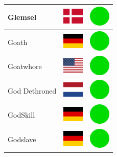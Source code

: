 \documentclass[12pt, a4paper, twoside]{report}
\begin{document}
\begin{center}
\begin{longtable}{|p{5cm}|p{2cm}|p{2cm}|}
 Glemsel                                                    & \includegraphics[width=1cm]{../4x3/dk} &   \includegraphics[width=1cm]{../likes/y} \\ \hline
 Goath                                                      & \includegraphics[width=1cm]{../4x3/de} &   \includegraphics[width=1cm]{../likes/y} \\ \hline
 Goatwhore                                                  & \includegraphics[width=1cm]{../4x3/us} &   \includegraphics[width=1cm]{../likes/y} \\ \hline
 God Dethroned                                              & \includegraphics[width=1cm]{../4x3/nl} &   \includegraphics[width=1cm]{../likes/y} \\ \hline
 GodSkill                                                   & \includegraphics[width=1cm]{../4x3/de} &   \includegraphics[width=1cm]{../likes/y} \\ \hline
 Godslave                                                   & \includegraphics[width=1cm]{../4x3/de} &   \includegraphics[width=1cm]{../likes/y} \\ \hline

\end{longtable}
\end{center}
\end{document}
